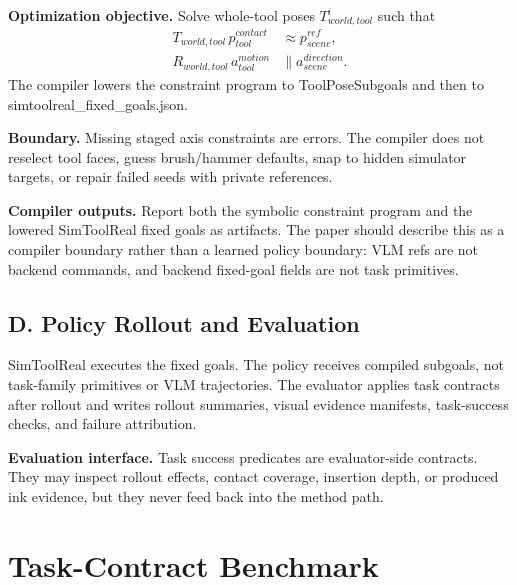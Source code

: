 \documentclass[journal]{IEEEtran}
\begin{document}
\textbf{Optimization objective.} Solve whole-tool poses $T^i_{world,tool}$ such
that
\begin{align}
T_{world,tool} \, p_{tool}^{contact} &\approx p_{scene}^{ref}, \\
R_{world,tool} \, a_{tool}^{motion} &\parallel a_{scene}^{direction}.
\end{align}
The compiler lowers the constraint program to ToolPoseSubgoals and then to
simtoolreal\_fixed\_goals.json.

\textbf{Boundary.} Missing staged axis constraints are errors. The compiler does
not reselect tool faces, guess brush/hammer defaults, snap to hidden simulator
targets, or repair failed seeds with private references.

\textbf{Compiler outputs.} Report both the symbolic constraint program and the
lowered SimToolReal fixed goals as artifacts. The paper should describe this as
a compiler boundary rather than a learned policy boundary: VLM refs are not
backend commands, and backend fixed-goal fields are not task primitives.

\subsection{D. Policy Rollout and Evaluation}
SimToolReal executes the fixed goals. The policy receives compiled subgoals, not
task-family primitives or VLM trajectories. The evaluator applies task
contracts after rollout and writes rollout summaries, visual evidence manifests,
task-success checks, and failure attribution.

\textbf{Evaluation interface.} Task success predicates are evaluator-side
contracts. They may inspect rollout effects, contact coverage, insertion depth,
or produced ink evidence, but they never feed back into the method path.

\section{Task-Contract Benchmark}
\end{document}
